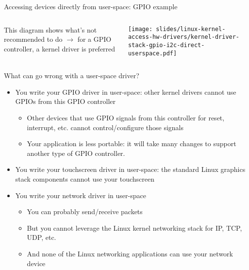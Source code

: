 \begin{frame}{Accessing devices directly from user-space: GPIO example}
  \begin{columns}
     {\small This diagram shows what's not
      recommended to do $\rightarrow$ for a GPIO controller, a kernel driver
      is preferred}
    \begin{center}
      \texttt{[image: slides/linux-kernel-access-hw-drivers/kernel-driver-stack-gpio-i2c-direct-userspace.pdf]}\\
    \end{center}
  \end{columns}
\end{frame}

\begin{frame}{What can go wrong with a user-space driver?}
  \begin{itemize}
  \item You write your GPIO driver in user-space: other kernel drivers
    cannot use GPIOs from this GPIO controller
    \begin{itemize}
    \item Other devices that use GPIO signals from this controller for reset, interrupt, etc. cannot control/configure those signals
    \item Your application is less portable: it will take many changes to support another type of GPIO controller.
    \end{itemize}
  \item You write your touchscreen driver in user-space: the standard
    Linux graphics stack components cannot use your touchscreen
  \item You write your network driver in user-space
    \begin{itemize}
    \item You can probably send/receive packets
    \item But you cannot leverage the Linux kernel networking stack
      for IP, TCP, UDP, etc.
    \item And none of the Linux networking applications can use your
      network device
    \end{itemize}
  \end{itemize}
\end{frame}


